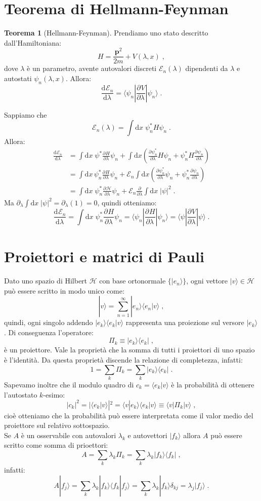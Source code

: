 \documentclass[10pt,a4paper]{report}
\theoremstyle{definition}
\newtheorem{thm}{Teorema}[section]
\newcommand{\pdev}[3][]{\frac{\partial^{#1} #2}{\partial #3^{#1}}}
\newcommand{\dev}[3][]{\frac{\mathrm{d}^{#1} #2}{\mathrm{d} #3^{#1}}}
\newcommand{\ham}{\mathcal{H}}
\numberwithin{equation}{section}
\newcommand{\diff}[1][]{\mathrm{d}#1}
\newcommand{\bra}{\langle}
\newcommand{\ket}{\rangle}
\begin{document}
\section{Teorema di Hellmann-Feynman}
\begin{thm}[Hellmann-Feynman] Prendiamo uno stato descritto dall'Hamiltoniana:
$$
H=\frac{\mathbf{p}^2}{2m}+V(\lambda,x)\;,
$$
dove $\lambda$ è un parametro, avente autovalori discreti $\mathcal{E}_n(\lambda)$ dipendenti da $\lambda$ e autostati $\psi_n(\lambda,x)$. Allora:
$$
\dev{\mathcal{E}_n}{\lambda}=\bra\psi_n|\pdev{V}{\lambda}|\psi_n\ket\;.
$$
\end{thm}
\proof
Sappiamo che
$$
\mathcal{E}_n(\lambda)=\int\diff{x}\;\psi_n^*H\psi_n\;.
$$
Allora:
\begin{align*}
\dev{\mathcal{E}_n}{\lambda}&= \int\diff{x}\;\psi^*\pdev{H}{\lambda}\psi_n+\int\diff{x}\left(\pdev{\psi_n^*}{\lambda}H\psi_n+\psi_n^*H\pdev{\psi_n}{\lambda}\right) \\
&= \int\diff{x}\,\psi_n^*\pdev{H}{\lambda}\psi_n+\mathcal{E}_n\int\diff{x}\left(\pdev{\psi_n^*}{\lambda}\psi_n+
\psi_n^*\pdev{\psi_n}{\lambda}\right) \\
&=\int\diff{x}\;\psi_n^*\pdev{\ham}{\lambda}\psi_n+\mathcal{E}_n\frac{\partial}{\partial\lambda}\int\diff{x}\;
|\psi|^2\;.
\end{align*}
Ma $\partial_{\lambda}\int\diff{x}\;|\psi|^2=\partial_{\lambda}(1)=0$, quindi otteniamo:
$$
\dev{\mathcal{E}_n}{\lambda}=\int\diff{x}\;\psi_n^*\pdev{H}{\lambda}\psi_n=\bra\psi_n|\pdev{H}{\lambda}|\psi_n\ket=\bra\psi|\pdev{V}{\lambda}|\psi\ket\;.
$$
\endproof
\section{Proiettori e matrici di Pauli}
Dato uno spazio di Hilbert $\ham$ con base ortonormale $\{|e_n\ket\}$, ogni vettore $|v\ket\in \ham$ può essere scritto in modo unico come:
$$
|v\ket=\sum_{n=1}^{\infty} |e_n\ket\bra e_n|v\ket\;,
$$
quindi, ogni singolo addendo $|e_k\ket\bra e_k|v\ket$ rappresenta una proiezione sul versore $|e_k\ket$. Di conseguenza l'operatore:
\begin{equation}
\Pi_k\equiv |e_k\ket\bra e_k|\;,
\end{equation}
è un proiettore. Vale la proprietà che la somma di tutti i proiettori di uno spazio è l'identità. Da questa proprietà discende la relazione di completezza, infatti:
$$
1=\sum_k \Pi_k=\sum_k |e_k\ket\bra e_k|\;.
$$
Sapevamo inoltre che il modulo quadro di $c_k=\bra e_k|v\ket$ è la probabilità di ottenere l'autostato $k$-esimo:
\begin{equation}
|c_k|^2=|\bra e_k|v\ket|^2=\bra v|e_k\ket\bra e_k|v\ket\equiv \bra v|\Pi_k|v\ket\;,
\end{equation}
cioè otteniamo che la probabilità può essere interpretata come il valor medio del proiettore sul relativo sottospazio. \\
Se $A$ è un osservabile con autovalori $\lambda_k$ e autovettori $|f_k\ket$ allora $A$ può essere scritto come somma di prioettori:
$$
A=\sum_k \lambda_k\Pi_k=\sum_k \lambda_k|f_k\ket\bra f_k|\;,
$$
infatti:
$$
A|f_j\ket=\sum_k\lambda_k|f_k\ket\bra f_k|f_j\ket=\sum_k \lambda_k|f_k\ket \delta_{kj}=\lambda_j|f_j\ket\;.
$$
\end{document}

